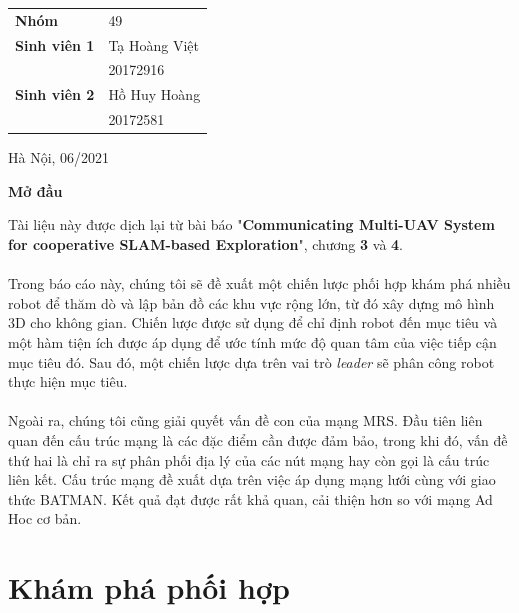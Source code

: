 \documentclass[11pt,openany]{book}
\begin{document}
\begin{titlepage}
\begin{center}
        \vspace{1cm}
        \Large
        \begin{center}
            \begin{tabular}{ l l }
                \textbf{Nhóm}        & 49            \\
                \textbf{Sinh viên 1} & Tạ Hoàng Việt \\
                                     & 20172916      \\
                \textbf{Sinh viên 2} & Hồ Huy Hoàng  \\
                                     & 20172581
            \end{tabular}
        \end{center}
        \vspace{1cm}
        \normalsize
        Hà Nội, 06/2021
    \end{center}
\end{titlepage}
\tableofcontents
\listoffigures
\listoftables
\newpage
\thispagestyle{plain}
\begin{center}
    \Huge
    \textbf{Mở đầu}
    \vspace{1cm}
\end{center}
Tài liệu này được dịch lại từ bài báo "\textbf{Communicating Multi-UAV System for cooperative SLAM-based Exploration}", chương \textbf{3} và \textbf{4}.\\\\
Trong báo cáo này, chúng tôi sẽ đề xuất một chiến lược phối hợp khám phá nhiều robot để thăm dò và lập bản đồ các khu vực rộng lớn, từ đó xây dựng mô hình 3D cho không gian. Chiến lược được sử dụng để chỉ định robot đến mục tiêu và một hàm tiện ích được áp dụng để ước tính mức độ quan tâm của việc tiếp cận mục tiêu đó. Sau đó, một chiến lược dựa trên vai trò \textit{leader} sẽ phân công robot thực hiện mục tiêu.\\\\
Ngoài ra, chúng tôi cũng giải quyết vấn đề con của mạng MRS. Đầu tiên liên quan đến cấu trúc mạng là các đặc điểm cần được đảm bảo, trong khi đó, vấn đề thứ hai là chỉ ra sự phân phối địa lý của các nút mạng hay còn gọi là cấu trúc liên kết. Cấu trúc mạng đề xuất dựa trên việc áp dụng mạng lưới cùng với giao thức BATMAN. Kết quả đạt được rất khả quan, cải thiện hơn so với mạng Ad Hoc cơ bản.
\chapter{Khám phá phối hợp}
\end{document}
